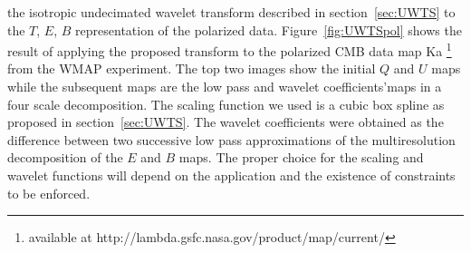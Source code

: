the isotropic undecimated wavelet transform described in section~\ref{sec:UWTS} to the $T$, $E$, $B$ representation of the polarized data. Figure~\ref{fig:UWTSpol} 
shows the result of applying the proposed transform to the polarized CMB data map Ka \footnote{available at http://lambda.gsfc.nasa.gov/product/map/current/ } 
from the WMAP experiment. The top two images show the initial $Q$ and $U$ maps while the subsequent maps are the low pass and wavelet coefficients'maps 
in a four scale decomposition. The scaling function we used is a cubic box spline as proposed in section~\ref{sec:UWTS}. The wavelet coefficients were 
obtained as the difference between two successive low pass approximations of the multiresolution decomposition of the $E$ and $B$ maps. The proper choice 
for the scaling and wavelet functions will depend on the application and the existence of constraints to be enforced.

